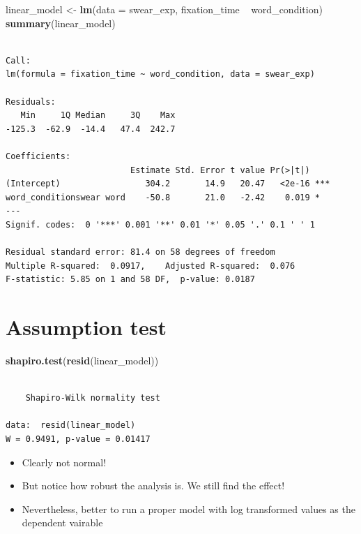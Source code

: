 \documentclass[]{article}
\newenvironment{Shaded}{}{}
\newcommand{\KeywordTok}[1]{\textcolor[rgb]{0.00,0.44,0.13}{\textbf{{#1}}}}
\newcommand{\DataTypeTok}[1]{\textcolor[rgb]{0.56,0.13,0.00}{{#1}}}
\newcommand{\StringTok}[1]{\textcolor[rgb]{0.25,0.44,0.63}{{#1}}}
\newcommand{\NormalTok}[1]{{#1}}
\begin{document}
\begin{Shaded}
\begin{Highlighting}[]
\NormalTok{linear_model <-}\StringTok{ }\KeywordTok{lm}\NormalTok{(}\DataTypeTok{data =} \NormalTok{swear_exp, fixation_time ~}\StringTok{ }\NormalTok{word_condition)}
\KeywordTok{summary}\NormalTok{(linear_model)}
\end{Highlighting}
\end{Shaded}

\begin{verbatim}

Call:
lm(formula = fixation_time ~ word_condition, data = swear_exp)

Residuals:
   Min     1Q Median     3Q    Max 
-125.3  -62.9  -14.4   47.4  242.7 

Coefficients:
                         Estimate Std. Error t value Pr(>|t|)    
(Intercept)                 304.2       14.9   20.47   <2e-16 ***
word_conditionswear word    -50.8       21.0   -2.42    0.019 *  
---
Signif. codes:  0 '***' 0.001 '**' 0.01 '*' 0.05 '.' 0.1 ' ' 1

Residual standard error: 81.4 on 58 degrees of freedom
Multiple R-squared:  0.0917,    Adjusted R-squared:  0.076 
F-statistic: 5.85 on 1 and 58 DF,  p-value: 0.0187
\end{verbatim}

\section{Assumption test}\label{assumption-test}

\begin{Shaded}
\begin{Highlighting}[]
\KeywordTok{shapiro.test}\NormalTok{(}\KeywordTok{resid}\NormalTok{(linear_model))}
\end{Highlighting}
\end{Shaded}

\begin{verbatim}

    Shapiro-Wilk normality test

data:  resid(linear_model)
W = 0.9491, p-value = 0.01417
\end{verbatim}

\begin{itemize}
\itemsep1pt\parskip0pt
\item
  Clearly not normal!
\item
  But notice how robust the analysis is. We still find the effect!
\item
  Nevertheless, better to run a proper model with log transformed values
  as the dependent vairable
\end{itemize}
\end{document}
